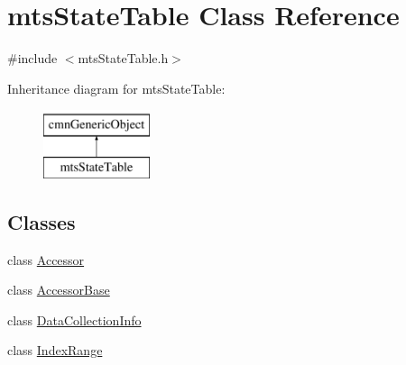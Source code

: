 \hypertarget{classmts_state_table}{\section{mts\-State\-Table Class Reference}
\label{classmts_state_table}
}


{\ttfamily \#include $<$mts\-State\-Table.\-h$>$}

Inheritance diagram for mts\-State\-Table\-:\begin{figure}[H]
\begin{center}
\leavevmode
\includegraphics[height=2.000000cm]{d1/d7e/classmts_state_table}
\end{center}
\end{figure}
\subsection*{Classes}
\begin{DoxyCompactItemize}
\item 
class \hyperlink{classmts_state_table_1_1_accessor}{Accessor}
\item 
class \hyperlink{classmts_state_table_1_1_accessor_base}{Accessor\-Base}
\item 
class \hyperlink{classmts_state_table_1_1_data_collection_info}{Data\-Collection\-Info}
\item 
class \hyperlink{classmts_state_table_1_1_index_range}{Index\-Range}
\end{DoxyCompactItemize}

